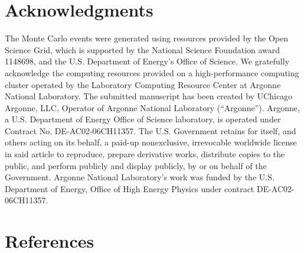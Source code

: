 \documentclass[final,1p,11pt]{elsarticle}
\begin{document}
\section*{Acknowledgments}
The Monte Carlo events were generated using resources provided by the Open Science Grid, 
which is supported by the National Science Foundation award 1148698, and the U.S. 
Department of Energy's Office of Science.
We gratefully acknowledge the computing resources provided on a
high-performance computing cluster operated by the
Laboratory Computing Resource Center at Argonne National Laboratory.
The submitted manuscript has been created by UChicago Argonne, LLC,
Operator of Argonne National Laboratory (“Argonne”). Argonne, a U.S.
Department of Energy Office of Science laboratory, is operated under
Contract No. DE-AC02-06CH11357. The U.S. Government retains for itself,
and others acting on its behalf, a paid-up nonexclusive, irrevocable
worldwide license in said article to reproduce, prepare derivative works,
distribute copies to the public, and perform publicly and display
publicly, by or on behalf of the Government.
Argonne National Laboratory’s work was
funded by the U.S. Department of Energy, Office of High Energy Physics
under contract DE-AC02-06CH11357.


\section*{References}


\def\bibname{\Large\bf References}


\clearpage

\appendix

\end{document}
